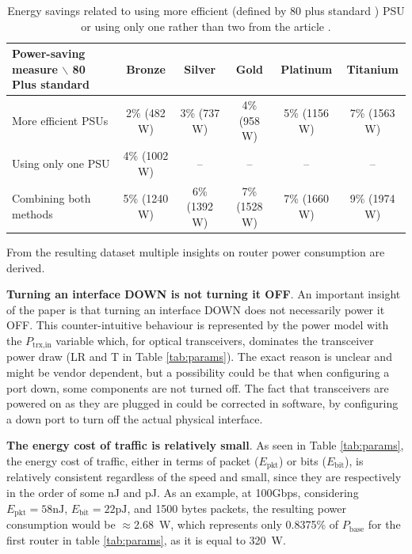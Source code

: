 \begin{table}[t]

	\caption{Energy savings related to using more efficient (defined by 80 plus standard \cite{80plus}) PSU or using only one rather than two from the article \cite{FantasticJoul}.}\label{tab:psu}
    \centering
    \begin{tabular}{lccccc}
        \toprule
        Power-saving measure $\backslash$ 80 Plus standard & Bronze & Silver & Gold & Platinum & Titanium \\
        \midrule
         More efficient PSUs & 2\% (482 W)  & 3\% (737 W)  & 4\% (958 W)  & 5\% (1156 W) & 7\% (1563 W) \\
         Using only one PSU        & 4\% (1002 W) & --           & --           & --           & --           \\
         Combining both methods                & 5\% (1240 W) & 6\% (1392 W) & 7\% (1528 W) & 7\% (1660 W) & 9\% (1974 W) \\
        \bottomrule
    \end{tabular}
\end{table}


From the resulting dataset multiple insights on router power consumption are derived. 

\textbf{Turning an interface DOWN is not turning it OFF}.
An important insight of the paper is that turning an interface DOWN does not necessarily power it OFF.
This counter-intuitive behaviour is represented by the power model with the $P_\text{trx,in}$ variable which, for optical transceivers, dominates the transceiver power draw (LR and T in Table \ref{tab:params}). 
The exact reason is unclear and might be vendor dependent, but a possibility could be that when configuring a port down, some components are not turned off.
The fact that transceivers are powered on as they are plugged in could be corrected in software, by configuring a down port to turn off the actual physical interface. 

\textbf{The energy cost of traffic is relatively small}.
As seen in Table \ref{tab:params}, the energy cost of traffic, either in terms of packet ($E_\text{pkt}$) or bits ($E_\text{bit}$), is relatively consistent regardless of the speed and small, since they are respectively in the order of some nJ and pJ.
As an example, at 100Gbps, considering $E_\text{pkt}=58 \text{nJ}$, $E_\text{bit}=22 \text{pJ}$, and 1500 bytes packets, the resulting power consumption would be $\approx$\qty{2.68}{\watt}, which represents only 0.8375\% of $P_\text{base}$ for the first router in table \ref{tab:params}, as it is equal to \qty{320}{\watt}.

